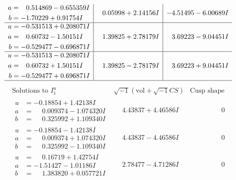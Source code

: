 \documentclass[1p]{elsarticle_modified}
\theoremstyle{definition}
\newcommand{\I}{\sqrt{-1}}
\begin{document}
$$\begin{array}{c|c|c}
\begin{aligned}
a &= \phantom{-}0.514869 - 0.655359 I \\
b &= -1.70229 + 0.91754 I\end{aligned}
 & \phantom{-}0.05998 + 2.14156 I & -4.51495 - 6.00689 I \\ \hline\begin{aligned}
u &= -0.531513 + 0.208071 I \\
a &= \phantom{-}0.60732 - 1.50151 I \\
b &= -0.529477 - 0.696871 I\end{aligned}
 & \phantom{-}1.39825 + 2.78179 I & \phantom{-}3.69223 - 9.04451 I \\ \hline\begin{aligned}
u &= -0.531513 - 0.208071 I \\
a &= \phantom{-}0.60732 + 1.50151 I \\
b &= -0.529477 + 0.696871 I\end{aligned}
 & \phantom{-}1.39825 - 2.78179 I & \phantom{-}3.69223 + 9.04451 I\\
 \hline 
 \end{array}$$\newpage$$\begin{array}{c|c|c}  
\text{Solutions to }I^u_{1}& \I (\text{vol} + \sqrt{-1}CS) & \text{Cusp shape}\\
 \hline 
\begin{aligned}
u &= -0.18854 + 1.42138 I \\
a &= \phantom{-}0.009374 - 1.074320 I \\
b &= \phantom{-}0.325992 + 1.109340 I\end{aligned}
 & \phantom{-}4.43837 + 4.46586 I & \phantom{-0.000000 } 0 \\ \hline\begin{aligned}
u &= -0.18854 - 1.42138 I \\
a &= \phantom{-}0.009374 + 1.074320 I \\
b &= \phantom{-}0.325992 - 1.109340 I\end{aligned}
 & \phantom{-}4.43837 - 4.46586 I & \phantom{-0.000000 } 0 \\ \hline\begin{aligned}
u &= \phantom{-}0.16719 + 1.42754 I \\
a &= -1.51427 - 1.01186 I \\
b &= \phantom{-}1.383820 + 0.057721 I\end{aligned}
 & \phantom{-}2.78477 - 4.71286 I & \phantom{-0.000000 } 0 \\ \hline\begin{aligned}

\end{aligned}
\end{array}$$
\end{document}
